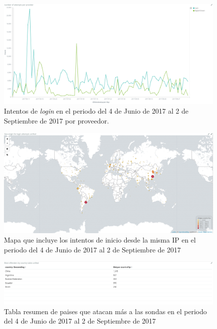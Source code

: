   \begin{figure}
    \centering
      \includegraphics[scale=0.3]{images/ElasticAttemptsPerProvider}
    \caption{Intentos de \emph{login} en el periodo del 4 de Junio de 2017 al 2 de Septiembre de 2017 por proveedor.}
    \label{fig:data-attempts-per-provider}
  \end{figure}

  \begin{figure}
    \centering
      \includegraphics[scale=0.3]{images/ElasticMapUnified}
    \caption{Mapa que incluye los intentos de inicio desde la misma IP en el periodo del 4 de Junio de 2017 al 2 de Septiembre de 2017}
    \label{fig:data-map-unified}
  \end{figure}

  \begin{figure}
    \centering
      \includegraphics[scale=0.3]{images/ElasticTableByCountryUnified}
    \caption{Tabla resumen de paises que atacan más a las sondas en el periodo del 4 de Junio de 2017 al 2 de Septiembre de 2017}
    \label{fig:data-table-by-country-unified}
  \end{figure}

